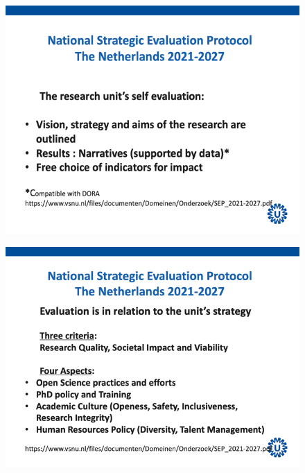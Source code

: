 \documentclass[empirical, authordate, ]{new-jote-article}
\begin{document}
	\begin{figure}
		\includegraphics[width=\linewidth]{media/image5.png}

		\caption{}

		\label{fig:rId20}


	\end{figure}
	\begin{figure}
		\includegraphics[width=\linewidth]{media/image6.png}

		\caption{}

		\label{fig:rId21}


	\end{figure}
\end{document}
